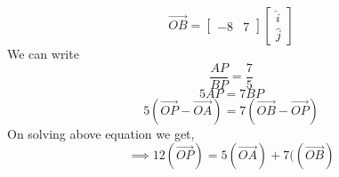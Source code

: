 \documentclass[journal,12pt,twocolumn]{IEEEtran}
\begin{document}
\begin{equation}
 \overrightarrow{OB} = 
 \begin{bmatrix}
 -8 & 7 
 \end{bmatrix}
 \begin{bmatrix}
 \hat{i}\\
 \hat{j}
 \end{bmatrix}
\end{equation}
We can write
\begin{equation}
\frac{AP}{BP} =  \frac{7}{5}   
\end{equation}
\begin{equation}
5AP=7BP
\end{equation}
\begin{equation}
5(\overrightarrow{OP}-\overrightarrow{OA})=7(\overrightarrow{OB}-\overrightarrow{OP})
\end{equation}
On solving  above equation we get,
\begin{equation}
\implies 12(\overrightarrow{OP})=5(\overrightarrow{OA})+7((\overrightarrow{OB})
\end{equation}
\end{document}
